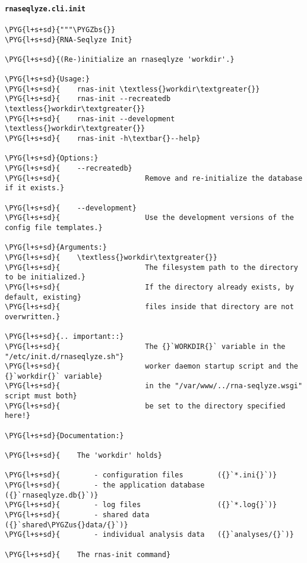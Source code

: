\paragraph{\texttt{rnaseqlyze.cli.init}}
\label{index-pdf4:rnaseqlyze-cli-init}
\begin{Verbatim}[commandchars=\\\{\}]
\PYG{l+s+sd}{"""\PYGZbs{}}
\PYG{l+s+sd}{RNA-Seqlyze Init}

\PYG{l+s+sd}{(Re-)initialize an rnaseqlyze 'workdir'.}

\PYG{l+s+sd}{Usage:}
\PYG{l+s+sd}{    rnas-init \textless{}workdir\textgreater{}}
\PYG{l+s+sd}{    rnas-init --recreatedb \textless{}workdir\textgreater{}}
\PYG{l+s+sd}{    rnas-init --development \textless{}workdir\textgreater{}}
\PYG{l+s+sd}{    rnas-init -h\textbar{}--help}

\PYG{l+s+sd}{Options:}
\PYG{l+s+sd}{    --recreatedb}
\PYG{l+s+sd}{                    Remove and re-initialize the database if it exists.}

\PYG{l+s+sd}{    --development}
\PYG{l+s+sd}{                    Use the development versions of the config file templates.}

\PYG{l+s+sd}{Arguments:}
\PYG{l+s+sd}{    \textless{}workdir\textgreater{}}
\PYG{l+s+sd}{                    The filesystem path to the directory to be initialized.}
\PYG{l+s+sd}{                    If the directory already exists, by default, existing}
\PYG{l+s+sd}{                    files inside that directory are not overwritten.}

\PYG{l+s+sd}{.. important::}
\PYG{l+s+sd}{                    The {}`WORKDIR{}` variable in the "/etc/init.d/rnaseqlyze.sh"}
\PYG{l+s+sd}{                    worker daemon startup script and the {}`workdir{}` variable}
\PYG{l+s+sd}{                    in the "/var/www/../rna-seqlyze.wsgi" script must both}
\PYG{l+s+sd}{                    be set to the directory specified here!}

\PYG{l+s+sd}{Documentation:}

\PYG{l+s+sd}{    The 'workdir' holds}

\PYG{l+s+sd}{        - configuration files        ({}`*.ini{}`)}
\PYG{l+s+sd}{        - the application database   ({}`rnaseqlyze.db{}`)}
\PYG{l+s+sd}{        - log files                  ({}`*.log{}`)}
\PYG{l+s+sd}{        - shared data                ({}`shared\PYGZus{}data/{}`)}
\PYG{l+s+sd}{        - individual analysis data   ({}`analyses/{}`)}

\PYG{l+s+sd}{    The rnas-init command}


\end{Verbatim}
